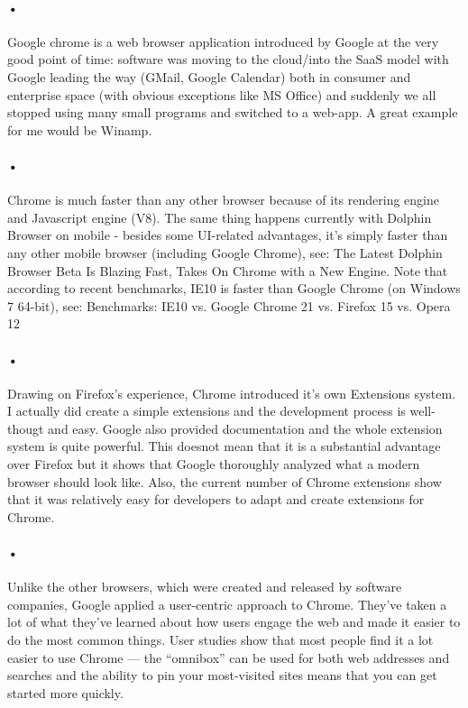 \documentclass[7pt]{article}
\begin{document}
\paragraph{•}
Google chrome is a web browser application introduced by Google at the very good point of time: software was moving to the cloud/into the SaaS model with Google leading the way (GMail, Google Calendar) both in consumer and enterprise space (with obvious exceptions like MS Office) and suddenly we all stopped using many small programs and switched to a web-app. A great example for me would be Winamp.\cite{Jeff}
\paragraph{•}
Chrome is much faster than any other browser because of its rendering engine and Javascript engine (V8). The same thing happens currently with Dolphin Browser on mobile - besides some UI-related advantages, it's simply faster than any other mobile browser (including Google Chrome), see: The Latest Dolphin Browser Beta Is Blazing Fast, Takes On Chrome with a New Engine. Note that according to recent benchmarks, IE10 is faster than Google Chrome (on Windows 7 64-bit), see: Benchmarks: IE10 vs. Google Chrome 21 vs. Firefox 15 vs. Opera 12\cite{Jeff}
\paragraph{•}
 Drawing on Firefox's experience, Chrome introduced it's own Extensions system. I actually did create a simple extensions and the development process is well-thougt and easy. Google also provided documentation and the whole extension system is quite powerful. This doesnot mean that it is a substantial advantage over Firefox but it shows that Google thoroughly analyzed what a modern browser should look like. Also, the current number of Chrome extensions show that it was relatively easy for developers to adapt and create extensions for Chrome.\cite{Jeff}
\paragraph{•}
Unlike the other browsers, which were created and released by software companies, Google applied a user-centric approach to Chrome. They’ve taken a lot of what they’ve learned about how users engage the web and made it easier to do the most common things. User studies show that most people find it a lot easier to use Chrome — the “omnibox” can be used for both web addresses and searches and the ability to pin your most-visited sites means that you can get started more quickly. \cite{Guilment}
\end{document}
